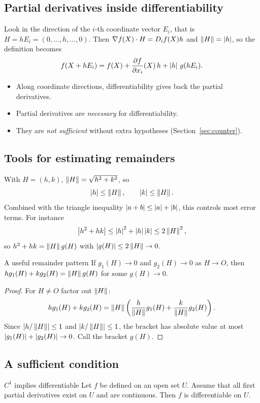 \subsection{Partial derivatives inside differentiability}

Look in the direction of the $i$-th coordinate vector $E_i$, that is $H=hE_i=(0,\dots,h,\dots,0)$.
Then $\nabla f(X)\cdot H=D_if(X)h$ and $\left\lVert H\right\rVert=\left\lvert h\right\rvert$, so the definition becomes
\[ f(X+hE_i)=f(X)+\frac{\partial f}{\partial x_i}(X)\,h+\left\lvert h\right\rvert\,g(hE_i). \]
\begin{itemize}
  \item Along coordinate directions, differentiability gives back the partial derivatives.
  \item Partial derivatives are \emph{necessary} for differentiability.
  \item They are \emph{not sufficient} without extra hypotheses (Section~\ref{sec:counter}).
\end{itemize}

\subsection{Tools for estimating remainders}

With $H=(h,k)$, $\left\lVert H\right\rVert=\sqrt{h^2+k^2}$, so
\[ \left\lvert h\right\rvert\le\left\lVert H\right\rVert,\qquad \left\lvert k\right\rvert\le\left\lVert H\right\rVert . \]
Combined with the triangle inequality $\left\lvert a+b\right\rvert\le\left\lvert a\right\rvert+\left\lvert b\right\rvert$, this controls most
error terms. For instance
\[ \left\lvert h^2+hk\right\rvert\le\left\lvert h\right\rvert^2+\left\lvert h\right\rvert\left\lvert k\right\rvert\le 2\left\lVert H\right\rVert^2 , \]
so $h^2+hk=\left\lVert H\right\rVert g(H)$ with $\left\lvert g(H)\right\rvert\le 2\left\lVert H\right\rVert\to0$.

\begin{proposition}{A useful remainder pattern}
If $g_1(H)\to0$ and $g_2(H)\to0$ as $H\to O$, then
$hg_1(H)+kg_2(H)=\left\lVert H\right\rVert g(H)$ for some $g(H)\to 0$.
\end{proposition}

\begin{proof}
For $H\neq O$ factor out $\left\lVert H\right\rVert$:
\[
hg_1(H)+kg_2(H)=\left\lVert H\right\rVert\left(\frac{h}{\left\lVert H\right\rVert}g_1(H)+\frac{k}{\left\lVert H\right\rVert}g_2(H)\right).
\]
Since $\left\lvert h/\left\lVert H\right\rVert\right\rvert\le1$ and $\left\lvert k/\left\lVert H\right\rVert\right\rvert\le1$, the bracket has absolute value at most
$\left\lvert g_1(H)\right\rvert+\left\lvert g_2(H)\right\rvert\to0$. Call the bracket $g(H)$.
\end{proof}

\subsection{A sufficient condition}

\begin{theorem}[label=thm:C1]{$C^1$ implies differentiable}
Let $f$ be defined on an open set $U$. Assume that all first partial derivatives exist on
$U$ and are continuous. Then $f$ is differentiable on $U$.
\end{theorem}

